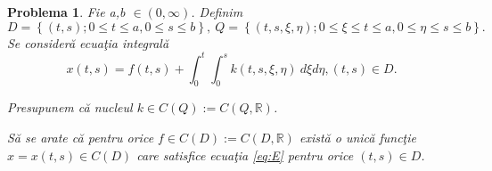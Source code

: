 \documentclass[a4paper,12pt,oneside]{report}
\newtheorem{problem}{Problema}
\begin{document}
\begin{problem}
Fie a,b \(\in \left ( 0,\infty  \right )\). Definim
\[ D = \left \{ \left ( t,s \right );0\leq t\leq a, 0\leq s\leq b \right \},~
Q = \left \{ \left ( t,s,\xi , \eta  \right );0\leq \xi \leq t\leq a, 0\leq \eta \leq s\leq b \right \}. \]		Se consider\u{a} ecua\c{t}ia integral\u{a}
\begin{displaymath}
  x\left ( t,s \right ) = f\left ( t,s \right ) + \int_{0}^{t}\int_{0}^{s}k\left ( t,s,\xi ,\eta  \right )\ d\xi d\eta , \left ( t,s \right ) \in D. \label{eq:E} \tag{E}
\end{displaymath}
  	      			      			      			      	
\noindent Presupunem c\u{a} nucleul \(k \in C\left ( Q \right ):=C\left ( Q,\mathbb{R} \right )\).

\noindent S\u{a} se arate c\u{a} pentru orice \(f \in C\left ( D \right ):= C\left ( D,\mathbb{R} \right )\) exist\u{a} o unic\u{a} func\c{t}ie  \(x = x\left ( t,s \right ) \in C\left ( D \right )\) care satisfice ecua\c{t}ia \ref{eq:E} pentru orice \(\left ( t,s \right ) \in D\).
\end{problem}
  	      			      			      			      	
\end{document}
